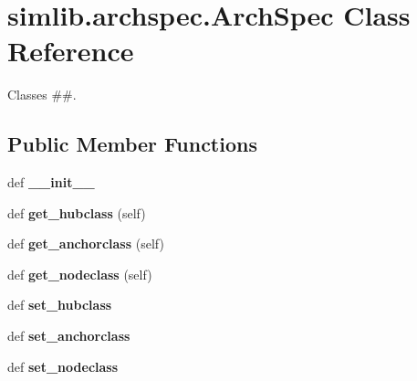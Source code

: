 \hypertarget{classsimlib_1_1archspec_1_1_arch_spec}{}\section{simlib.\+archspec.\+Arch\+Spec Class Reference}
\label{classsimlib_1_1archspec_1_1_arch_spec}


Classes \#\#.  


\subsection*{Public Member Functions}
\begin{DoxyCompactItemize}
\item 
\mbox{\label{classsimlib_1_1archspec_1_1_arch_spec_a6632a5eed5f33524fa2a6a51a4f01274}} 
def {\bfseries \+\_\+\+\_\+init\+\_\+\+\_\+}
\item 
\mbox{\label{classsimlib_1_1archspec_1_1_arch_spec_a630555d33bafc4fda4e3ef4a4a856b13}} 
def {\bfseries get\+\_\+hubclass} (self)
\item 
\mbox{\label{classsimlib_1_1archspec_1_1_arch_spec_aca0be1948149b2a220106d5bb4bc3c56}} 
def {\bfseries get\+\_\+anchorclass} (self)
\item 
\mbox{\label{classsimlib_1_1archspec_1_1_arch_spec_a731ef67f540e5961937ccda28babfe21}} 
def {\bfseries get\+\_\+nodeclass} (self)
\item 
\mbox{\label{classsimlib_1_1archspec_1_1_arch_spec_a5419a0d3b27b4864a9cea18f3f42ec2f}} 
def {\bfseries set\+\_\+hubclass}
\item 
\mbox{\label{classsimlib_1_1archspec_1_1_arch_spec_afb99f1d749346f5336ecdd6ff9d1cce6}} 
def {\bfseries set\+\_\+anchorclass}
\item 
\mbox{\label{classsimlib_1_1archspec_1_1_arch_spec_a083a2500010362bcd18101dcf1cc6e6d}} 
def {\bfseries set\+\_\+nodeclass}
\end{DoxyCompactItemize}


